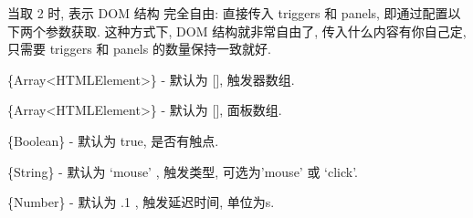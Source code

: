 \documentclass[letterpaper,10pt,english]{sphinxmanual}
\begin{document}
\begin{fulllineitems}
当取 2 时,  表示 DOM 结构 完全自由: 直接传入 triggers 和 panels, 即通过配置以下两个参数获取. 这种方式下, DOM 结构就非常自由了, 传入什么内容有你自己定, 只需要 triggers 和 panels 的数量保持一致就好.

\end{fulllineitems}



\begin{fulllineitems}
\label{api/component/switchable/switchable:Switchable.triggers}
\{Array\textless{}HTMLElement\textgreater{}\} - 默认为 {[}{]}, 触发器数组.

\end{fulllineitems}



\begin{fulllineitems}
\label{api/component/switchable/switchable:Switchable.panels}
\{Array\textless{}HTMLElement\textgreater{}\} - 默认为 {[}{]}, 面板数组.

\end{fulllineitems}



\begin{fulllineitems}
\label{api/component/switchable/switchable:Switchable.hasTriggers}
\{Boolean\} - 默认为 true, 是否有触点.

\end{fulllineitems}



\begin{fulllineitems}
\label{api/component/switchable/switchable:Switchable.triggerType}
\{String\} - 默认为 `mouse' , 触发类型,  可选为'mouse' 或 `click'.

\end{fulllineitems}



\begin{fulllineitems}
\label{api/component/switchable/switchable:Switchable.delay}
\{Number\} - 默认为 .1 , 触发延迟时间, 单位为s.

\end{fulllineitems}
\end{document}
